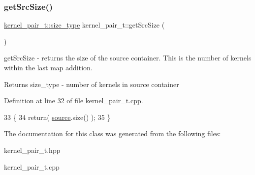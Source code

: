 \subsubsection{\texorpdfstring{get\+Src\+Size()}{getSrcSize()}}
{\footnotesize\ttfamily \hyperlink{classkernel__pair__t_aec4bb36f70893ab1bf0a912e8c3aca2a}{kernel\+\_\+pair\+\_\+t\+::size\+\_\+type} kernel\+\_\+pair\+\_\+t\+::get\+Src\+Size (\begin{DoxyParamCaption}{ }\end{DoxyParamCaption})\hspace{0.3cm}{\ttfamily [noexcept]}}

get\+Src\+Size -\/ returns the size of the source container. This is the number of kernels within the last map addition. \begin{DoxyReturn}{Returns}
size\+\_\+type -\/ number of kernels in source container 
\end{DoxyReturn}


Definition at line 32 of file kernel\+\_\+pair\+\_\+t.\+cpp.


\begin{DoxyCode}
33 \{
34     \textcolor{keywordflow}{return}( \hyperlink{classsource}{source}.size() );
35 \}
\end{DoxyCode}


The documentation for this class was generated from the following files\+:\begin{DoxyCompactItemize}
\item 
kernel\+\_\+pair\+\_\+t.\+hpp\item 
kernel\+\_\+pair\+\_\+t.\+cpp\end{DoxyCompactItemize}
